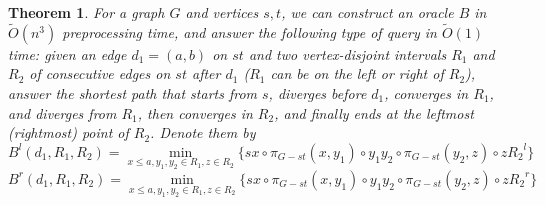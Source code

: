 \documentclass[11pt]{article}
\theoremstyle{plain}
\newtheorem{theorem}{Theorem}[section]
\theoremstyle{definition}
\newcommand{\too}[1]{\tilde{O}({#1})}
\newcommand{\zdd}[1]{{#1}^{l}}
\newcommand{\ydd}[1]{{#1}^{r}}
\begin{document}
\begin{theorem}\label{thm:oracle-B}
   For a graph $G$ and vertices $s,t$, we can construct an oracle $B$ in $\too{n^3}$ preprocessing time, and answer the following type of query in $\too{1}$ time: given an edge $d_1=(a,b)$ on $st$ and two vertex-disjoint intervals $R_1$ and $R_2$ of consecutive edges on $st$ after $d_1$ ($R_1$ can be on the left or right of $R_2$), answer the shortest path that starts from $s$, diverges before $d_1$, converges in $R_1$, and diverges from $R_1$, then converges in $R_2$, and finally ends at the leftmost (rightmost) point of $R_2$. Denote them by 
    $$B^l(d_1,R_1,R_2) = \min_{x\leq a, y_1, y_2\in {R_1}, z\in {R_2}} \{sx\circ \pi_{G-st}(x, y_1)\circ y_1y_2\circ \pi_{G-st}(y_2, z)\circ z\zdd{R_2}\}$$ 
    $$B^r(d_1,R_1,R_2) = \min_{x\leq a, y_1, y_2\in {R_1}, z\in {R_2}} \{sx\circ \pi_{G-st}(x, y_1)\circ y_1y_2\circ \pi_{G-st}(y_2, z)\circ z\ydd{R_2}\}$$ 
\end{theorem}
\end{document}
